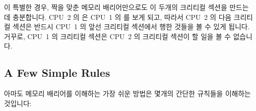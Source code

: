 이 특별한 경우, 짝을 맞춘 메모리 배리어만으로도 이 두개의 크리티컬 섹션을
만드는데 충분합니다.
CPU~2 의  은 CPU~1 의  를 보게 되고,
따라서 CPU~2 의 다음 크리티컬 섹션은 반드시 CPU~1 의 앞선 크리티컬 섹션에서
행한 것들을 볼 수 있게 됩니다.
거꾸로, CPU~1 의 크리티컬 섹션은 CPU~2 의 크리티컬 섹션이 할 일을 볼 수
없습니다.

\subsection{A Few Simple Rules}
\label{sec:advsync:A Few Simple Rules}

아마도 메모리 배리어를 이해하는 가장 쉬운 방법은 몇개의 간단한 규칙들을
이해하는 것입니다:

